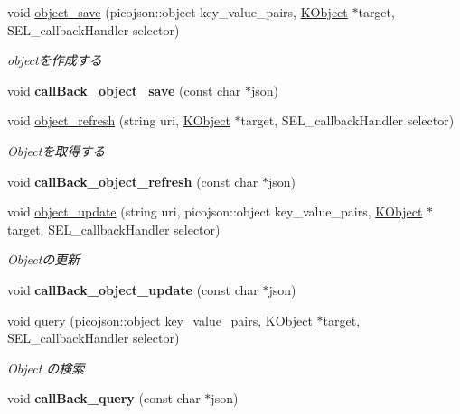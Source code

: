 \begin{DoxyCompactItemize}
\item 
void \hyperlink{class_c_kii_bucket_af968ac6a7a4d75a7c0ce413a142388cc}{object\-\_\-save} (picojson\-::object key\-\_\-value\-\_\-pairs, \hyperlink{class_k_object}{K\-Object} $\ast$target, S\-E\-L\-\_\-callback\-Handler selector)
\begin{DoxyCompactList}\small\item\em objectを作成する \end{DoxyCompactList}\item 
\hypertarget{class_c_kii_bucket_a57b3dfbce914b0d8ef38145be32f79b3}{void {\bfseries call\-Back\-\_\-object\-\_\-save} (const char $\ast$json)}\label{class_c_kii_bucket_a57b3dfbce914b0d8ef38145be32f79b3}

\item 
void \hyperlink{class_c_kii_bucket_ab5af39edbe6a0e1a136fb620617b63c0}{object\-\_\-refresh} (string uri, \hyperlink{class_k_object}{K\-Object} $\ast$target, S\-E\-L\-\_\-callback\-Handler selector)
\begin{DoxyCompactList}\small\item\em Objectを取得する \end{DoxyCompactList}\item 
\hypertarget{class_c_kii_bucket_ae5fd5045697030cdce7d004fb7e26bc4}{void {\bfseries call\-Back\-\_\-object\-\_\-refresh} (const char $\ast$json)}\label{class_c_kii_bucket_ae5fd5045697030cdce7d004fb7e26bc4}

\item 
void \hyperlink{class_c_kii_bucket_ae9e9ec58df6859c91c4eab89140867b0}{object\-\_\-update} (string uri, picojson\-::object key\-\_\-value\-\_\-pairs, \hyperlink{class_k_object}{K\-Object} $\ast$target, S\-E\-L\-\_\-callback\-Handler selector)
\begin{DoxyCompactList}\small\item\em Objectの更新 \end{DoxyCompactList}\item 
\hypertarget{class_c_kii_bucket_aca9a0b2e3caf7495711312828632bd8e}{void {\bfseries call\-Back\-\_\-object\-\_\-update} (const char $\ast$json)}\label{class_c_kii_bucket_aca9a0b2e3caf7495711312828632bd8e}

\item 
void \hyperlink{class_c_kii_bucket_a0c67e3094a34addff7f0763e86f72abe}{query} (picojson\-::object key\-\_\-value\-\_\-pairs, \hyperlink{class_k_object}{K\-Object} $\ast$target, S\-E\-L\-\_\-callback\-Handler selector)
\begin{DoxyCompactList}\small\item\em Object の検索 \end{DoxyCompactList}\item 
\hypertarget{class_c_kii_bucket_aa36a27887af9177dc7809da7b723bb47}{void {\bfseries call\-Back\-\_\-query} (const char $\ast$json)}\label{class_c_kii_bucket_aa36a27887af9177dc7809da7b723bb47}

\end{DoxyCompactItemize}
